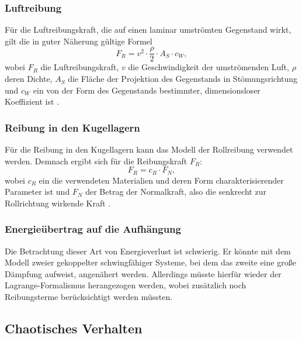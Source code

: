 \subsubsection{Luftreibung}
Für die Luftreibungskraft, die auf einen laminar umströmten Gegenstand wirkt, gilt die in guter Näherung gültige Formel
\begin{equation}
F_R = v^2 \cdot \frac{\rho}{2} \cdot A_S \cdot c_W,
\label{luftreibung}
\end{equation}
wobei $ F_R $ die Luftreibungskraft, $ v $ die Geschwindigkeit der umströmenden Luft, $ \rho $ deren Dichte, $ A_S $ die Fläche der Projektion des Gegenstands in Stömungsrichtung und $ c_W $ ein von der Form des Gegenstands bestimmter, dimensionsloser Koeffizient ist \cite{win}. 


\subsubsection{Reibung in den Kugellagern}
Für die Reibung in den Kugellagern kann das Modell der Rollreibung verwendet werden. Demnach ergibt sich für die Reibungskraft $ F_R $:
\begin{equation}
F_R = c_R \cdot F_N,
\end{equation} 
wobei $ c_R $ ein die verwendeten Materialien und deren Form charakterisierender Parameter ist und $ F_N $ der Betrag der Normalkraft, also die senkrecht zur Rollrichtung wirkende Kraft \cite{rol}. 

\subsubsection{Energieübertrag auf die Aufhängung}

Die Betrachtung dieser Art von Energieverlust ist schwierig. Er könnte mit dem Modell zweier gekoppelter schwingfähiger Systeme, bei dem das zweite eine große Dämpfung aufweist, angenähert werden. Allerdings müsste hierfür wieder der Lagrange-Formalismus herangezogen werden, wobei zusätzlich noch Reibungsterme berücksichtigt werden müssten. 

\subsection{Chaotisches Verhalten}
